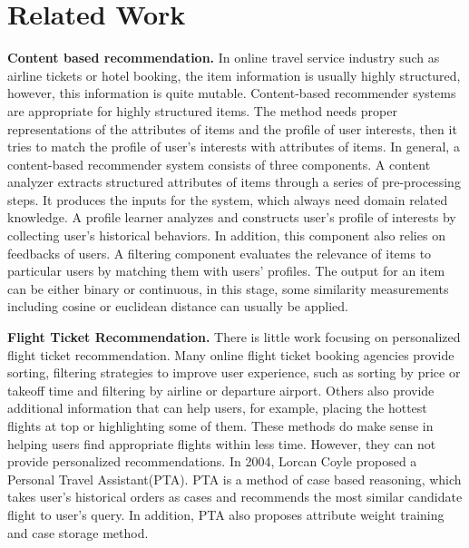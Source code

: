 \documentclass{llncs}
\begin{document}
\section{Related Work}\par
\label{sec:relw}
\textbf{Content based recommendation.} In online travel service industry such as airline tickets or hotel booking, the item information is usually highly structured, however, this information is quite mutable. Content-based recommender systems \cite{tech:cset}\cite{lops:handbook}are appropriate for highly structured items. The method needs proper representations of the attributes of items and the profile of user interests, then it tries to match  the profile of user's interests with attributes of items. In general, a content-based recommender system consists of three components. A content analyzer extracts structured attributes of items through a series of pre-processing steps. It produces the inputs for the system, which always need domain related knowledge. A profile learner analyzes and constructs user's profile of interests by collecting user's historical behaviors. In addition, this component also relies on feedbacks of users. A filtering component evaluates the relevance of items to particular users by matching them with users' profiles. The output for an item can be either binary or continuous, in this stage, some similarity measurements including cosine or euclidean distance can usually be applied.\par
\textbf{Flight Ticket Recommendation.} There is little work focusing on personalized flight ticket recommendation. Many online flight ticket booking agencies provide sorting, filtering strategies to improve user experience, such as sorting by price or takeoff time and filtering by airline or departure airport. Others also provide additional information that can help users, for example, placing the hottest flights at top or highlighting some of them. These methods do make sense in helping users find appropriate flights within less time. However, they can not provide personalized recommendations. In 2004, Lorcan Coyle\cite{lor:flight} proposed a Personal Travel Assistant(PTA). PTA is a method of case based reasoning, which takes user's historical orders as cases and recommends the most similar candidate flight to user's query. In addition, PTA also proposes attribute weight training and case storage method.\par
\end{document}
